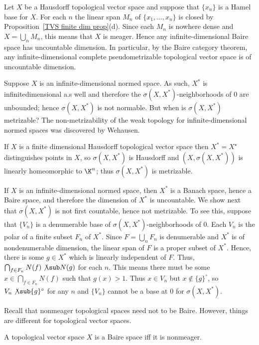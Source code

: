 \begin{example}
Let $X$ be a Hausdorff topological vector space and suppose that $\{x_n\}$ is a Hamel base for $X$. For each $n$ the linear span $M_n$ of $\{x_1,\dots,x_n\}$ is closed by Proposition~\ref{TVS finite dim prop}(d). Since each $M_n$ is nowhere dense and $X=\bigcup_nM_n$, this means that $X$ is meager. Hence any infinite-dimensional Baire space has uncountable dimension. In particular, by the Baire category theorem, any infinite-dimensional complete pseudometrizable topological vector space is of uncountable dimension.
\end{example}
Suppose $X$ is an infinite-dimensional normed space. As such, $X^*$ is infinitedimensional a.s well and therefore the $\sigma(X,X^*)$-neighborhoods of $0$ are unbounded; hence $\sigma(X,X^*)$ is not normable. But when is $\sigma(X,X^*)$ metrizable? The non-metrizability of the weak topology for infinite-dimensional normed spaces was discovered by Wehausen.
\begin{example}\label{weak topo metrizable iff finite dim}
If $X$ is a finite dimensional Hausdorff topological vector space then $X^*=X^{\star}$ distinguishes points in $X$, so $\sigma(X,X^*)$ is Hausdorff and $(X,\sigma(X,X^*))$ is linearly homeomorphic to $\K^n$; thus $\sigma(X,X^*)$ is metrizable.\par
If $X$ is an infinite-dimensional normed space, then $X^*$ is a Banach space, hence a Baire space, and therefore the dimension of $X^*$ is uncountable. We show next that $\sigma(X,X^*)$ is not first countable, hence not metrizable. To see this, suppose that $\{V_n\}$ is a denumerable base of $\sigma(X,X^*)$-neighborhoods of $0$. Each $V_n$ is the polar of a finite subset $F_n$ of $X^*$. Since $F=\bigcup_nF_n$ is denumerable and $X^*$ is of nondenumerable dimension, the linear span of $F$ is a proper subset of $X^*$. Hence, there is some $g\in X^*$ which is linearly independent of $F$. Thus, $\bigcap_{f\in F_n}N(f)\not\sub N(g)$ for each $n$. This means there must be some $x\in\bigcap_{f\in F_n}N(f)$ such that $g(x)>1$. Thus $x\in V_n$ but $x\notin\{g\}^\circ$, so $V_n\not\sub\{g\}^\circ$ for any $n$ and $\{V_n\}$ cannot be a base at $0$ for $\sigma(X,X^*)$.
\end{example}
Recall that nonmeager topological spaces need not to be Baire. However, things are different for topological vector spaces.
\begin{proposition}\label{TVS Baire iff nonmeager}
A topological vector space $X$ is a Baire space iff it is nonmeager.
\end{proposition}
